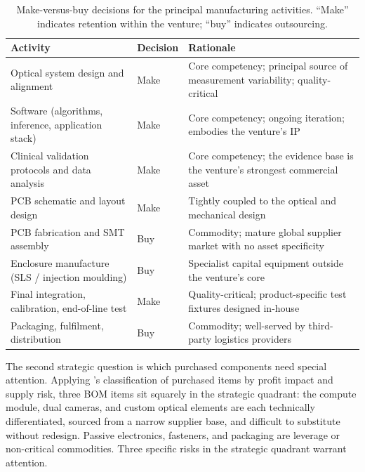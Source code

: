 \begin{table}[htbp]
    \centering
    \caption{Make-versus-buy decisions for the principal manufacturing activities. ``Make'' indicates retention within the venture; ``buy'' indicates outsourcing.}
    \label{tab:make-vs-buy}
    \footnotesize
    \begin{tabular}{p{4.5cm}lp{7cm}}
        \toprule
        \textbf{Activity} & \textbf{Decision} & \textbf{Rationale} \\
        \midrule
        Optical system design and alignment & Make & Core competency; principal source of measurement variability; quality-critical \\
        Software (algorithms, inference, application stack) & Make & Core competency; ongoing iteration; embodies the venture's IP \\
        Clinical validation protocols and data analysis & Make & Core competency; the evidence base is the venture's strongest commercial asset \\
        PCB schematic and layout design & Make & Tightly coupled to the optical and mechanical design \\
        PCB fabrication and SMT assembly & Buy & Commodity; mature global supplier market with no asset specificity \\
        Enclosure manufacture (SLS / injection moulding) & Buy & Specialist capital equipment outside the venture's core \\
        Final integration, calibration, end-of-line test & Make & Quality-critical; product-specific test fixtures designed in-house \\
        Packaging, fulfilment, distribution & Buy & Commodity; well-served by third-party logistics providers \\
        \bottomrule
    \end{tabular}
\end{table}

The second strategic question is which purchased components need special attention. Applying \citet{kraljic1983purchasing}'s classification of purchased items by profit impact and supply risk, three BOM items sit squarely in the strategic quadrant: the compute module, dual cameras, and custom optical elements are each technically differentiated, sourced from a narrow supplier base, and difficult to substitute without redesign. Passive electronics, fasteners, and packaging are leverage or non-critical commodities. Three specific risks in the strategic quadrant warrant attention.

